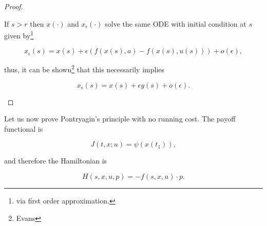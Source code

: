 \begin{lemma}
\begin{proof}
\begin{itemize}
            If $s>r$ then $x(\cdot)$ and $x_{\epsilon}(\cdot)$ solve the same ODE with initial condition at $s$ given by\footnote{via first order approximation.}

            \[x_{\epsilon}(s) = x(s) + \epsilon (f(x(s),a) - f(x(s),u(s))) + o(\epsilon),\]

            thus, it can be shown\footnote{Evans} that this necessarily implies

            \[x_{\epsilon}(s) = x(s) + \epsilon y(s) + o(\epsilon).\]
        \end{itemize}
    \end{proof}
\end{lemma}

Let us now prove Pontryagin's principle with no running cost. The payoff functional is

\begin{equation}\label{1-proofpontry-norunfunct}
    J(t,x;u) = \psi(x(t_1)),
\end{equation}

and therefore the Hamiltonian is

\begin{equation}\label{1-proofpontry-norunham}
    H(s,x,u,p) = - f(s,x,u)\cdot p. 
\end{equation}

